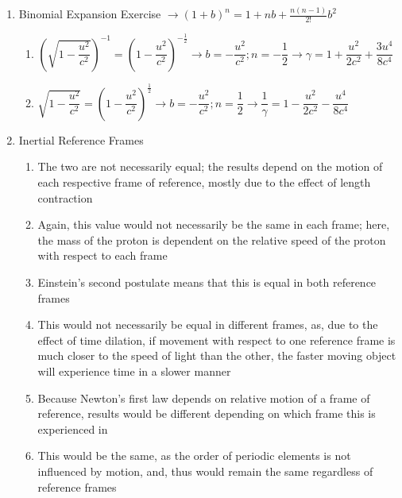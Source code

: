 \begin{enumerate}

  \item Binomial Expansion Exercise $\rightarrow (1+b)^n=1+nb+\frac{n(n-1)}{2!}b^2$

    \begin{enumerate}

      \item $\left(\sqrt{1-\dfrac{u^2}{c^2}}\right)^{-1}=\left( 1-\dfrac{u^2}{c^2} \right)^{-\frac{1}{2}}\longrightarrow b=-\dfrac{u^2}{c^2}; n=-\dfrac{1}{2}\longrightarrow\boxed{\gamma=1+\dfrac{u^2}{2c^2}+\dfrac{3u^4}{8c^4}}$

      \item $\sqrt{1-\dfrac{u^2}{c^2}}=\left( 1-\dfrac{u^2}{c^2} \right)^{\frac{1}{2}}\longrightarrow b=-\dfrac{u^2}{c^2}; n=\dfrac{1}{2}\longrightarrow\boxed{\dfrac{1}{\gamma}=1-\dfrac{u^2}{2c^2}-\dfrac{u^4}{8c^4}}$
        
    \end{enumerate}

  \item Inertial Reference Frames

    \begin{enumerate}

      \item The two are not necessarily equal; the results depend on the motion of each respective frame of reference, mostly due to the effect of length contraction

      \item Again, this value would not necessarily be the same in each frame; here, the mass of the proton is dependent on the relative speed of the proton with respect to each frame

      \item Einstein's second postulate means that this is equal in both reference frames

      \item This would not necessarily be equal in different frames, as, due to the effect of time dilation, if movement with respect to one reference frame is much closer to the speed of light than the other, the faster moving object will experience time in a slower manner

      \item Because Newton's first law depends on relative motion of a frame of reference, results would be different depending on which frame this is experienced in

      \item This would be the same, as the order of periodic elements is not influenced by motion, and, thus would remain the same regardless of reference frames


\end{enumerate}
\end{enumerate}
